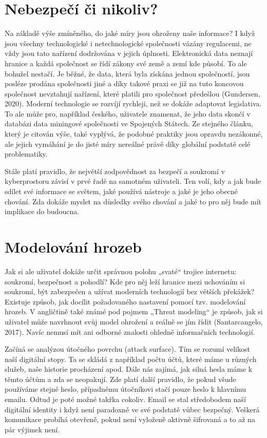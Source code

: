 \documentclass{article}
\begin{document}
\begin{spacing}{1.15}
		\section*{Nebezpečí či nikoliv?}
		Na základě výše zmíněného, do jaké míry jsou ohroženy naše informace? I když jsou všechny technologické i netechnologické společnosti vázány regulacemi, ne vždy jsou tato nařízení dodržována v jejich úplnosti. Elektronická data neznají hranice a každá společnost se řídí zákony své země a zemí kde působí. To ale bohužel nestačí. Je běžné, že data, která byla získána jednou společností, jsou posléze prodána společnosti jiné a díky takové praxi se již na tuto koncovou společnost nevztahují nařízení, které platili pro společnost předešlou (Gundersen, 2020). Moderní technologie se rozvíjí rychleji, než se dokáže adaptovat legislativa. To ale může pro, například českého, uživatele znamenat, že jeho data skončí v databázi data miningové společnosti ve Spojených Státech. Ze stejného článku, který je citován výše, také vyplývá, že podobné praktiky jsou opravdu nezákonné, ale jejich vymáhání je do jisté míry nereálné právě díky globální podstatě celé problematiky.
		
		Stále platí pravidlo, že největší zodpovědnost za bezpečí a soukromí v kyberprostoru závisí v prvé řadě na samotném uživateli. Ten volí, kdy a jak bude sdílet své informace se světem, jaké používá nástroje a jaké je jeho obecné chování. Zda dokáže myslet na důsledky svého chování a jaké to pro něj bude mít implikace do budoucna.
		
		\section*{Modelování hrozeb}
		Jak si ale uživatel dokáže určit správnou polohu „svaté“ trojice internetu: soukromí, bezpečnost a pohodlí? Kde pro něj leží hranice mezi uchováním si soukromí, být zabezpečen a užívat moderních technologií bez větších překážek? Existuje způsob, jak docílit požadovaného nastavení pomocí tzv. modelování hrozeb. V angličtině také známé pod pojmem „Threat modeling“ je způsob, jak si uživatel může navrhnout svůj model ohrožení a reálně se jím řídit (Santarcangelo, 2017). Navíc nemusí mít ani odborné znalosti ohledně informačních technologií.
		
		Začíná se analýzou útočného povrchu (attack surface). Tím se rozumí velikost naší digitální stopy. Ta se skládá z například počtu účtů, které máme u různých služeb, naše historie procházení apod. Dále nás zajímá, jak silná hesla máme k těmto účtům a zda se neopakují. Zde platí další pravidlo, že pokud všude používáme stejné heslo, případnému útočníkovi stačí pouze heslo k hlavnímu emailu. Odtud je poté možné takřka cokoliv. Email se stal středobodem naší digitální identity i když není paradoxně ve své podstatě vůbec bezpečný. Veškerá komunikace probíhá otevřeně, pokud není vyloženě aktivně šifrovaná a to až na pár výjimek není.
		

\end{spacing}
\end{document}
